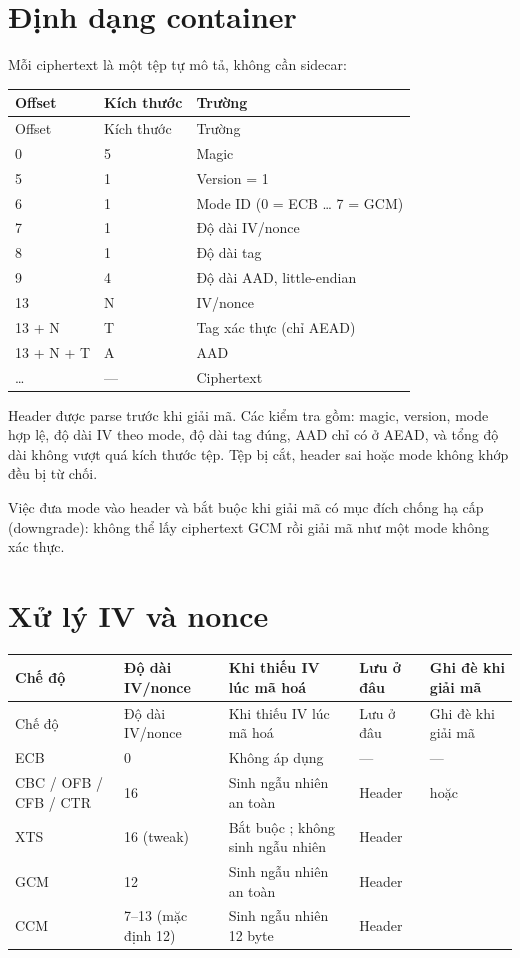 \documentclass[12pt,a4paper,oneside]{report}
\let\origtexttt\texttt
\renewcommand{\texttt}[1]{\origtexttt{\seqsplit{#1}}}
\begin{document}
\section{Định dạng container}


Mỗi ciphertext là một tệp tự mô tả, không cần sidecar:


\begin{longtable}{p{}p{}p{}}
\toprule
Offset & Kích thước & Trường \\
\midrule
\endfirsthead
\toprule
Offset & Kích thước & Trường \\
\midrule
\endhead
0 & 5 & Magic \texttt{AESL1} \\
5 & 1 & Version = 1 \\
6 & 1 & Mode ID (0 = ECB … 7 = GCM) \\
7 & 1 & Độ dài IV/nonce \\
8 & 1 & Độ dài tag \\
9 & 4 & Độ dài AAD, little-endian \\
13 & N & IV/nonce \\
13 + N & T & Tag xác thực (chỉ AEAD) \\
13 + N + T & A & AAD \\
… & — & Ciphertext \\
\bottomrule
\end{longtable}


Header được parse trước khi giải mã. Các kiểm tra gồm: magic, version, mode hợp lệ, độ dài IV theo mode, độ dài tag đúng, AAD chỉ có ở AEAD, và tổng độ dài không vượt quá kích thước tệp. Tệp bị cắt, header sai hoặc mode không khớp đều bị từ chối.


Việc đưa mode vào header và bắt buộc \texttt{--mode} khi giải mã có mục đích chống hạ cấp (downgrade): không thể lấy ciphertext GCM rồi giải mã như một mode không xác thực.


\section{Xử lý IV và nonce}


\begin{longtable}{p{}p{}p{}p{}p{}}
\toprule
Chế độ & Độ dài IV/nonce & Khi thiếu IV lúc mã hoá & Lưu ở đâu & Ghi đè khi giải mã \\
\midrule
\endfirsthead
\toprule
Chế độ & Độ dài IV/nonce & Khi thiếu IV lúc mã hoá & Lưu ở đâu & Ghi đè khi giải mã \\
\midrule
\endhead
ECB & 0 & Không áp dụng & — & — \\
CBC / OFB / CFB / CTR & 16 & Sinh ngẫu nhiên an toàn & Header & \texttt{--iv} hoặc \texttt{--nonce} \\
XTS & 16 (tweak) & Bắt buộc \texttt{--iv}; không sinh ngẫu nhiên & Header & \texttt{--iv} \\
GCM & 12 & Sinh ngẫu nhiên an toàn & Header & \texttt{--nonce} \\
CCM & 7–13 (mặc định 12) & Sinh ngẫu nhiên 12 byte & Header & \texttt{--nonce} \\
\bottomrule
\end{longtable}
\end{document}
